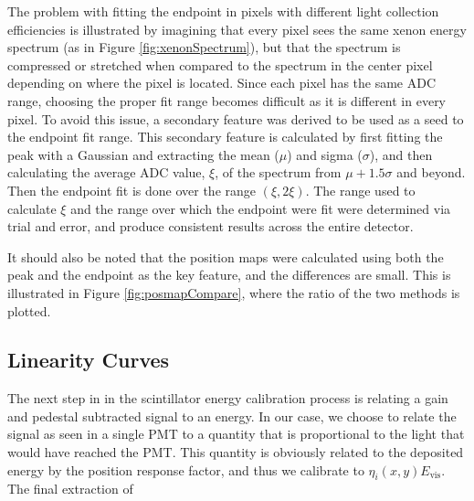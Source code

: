 The problem with fitting the endpoint in pixels with different light collection efficiencies is illustrated by
imagining that every pixel sees the same xenon energy spectrum (as in Figure \ref{fig:xenonSpectrum}), but that
the spectrum is compressed or stretched when compared to the spectrum in the center pixel depending on where
the pixel is located. Since each pixel has the same ADC range, choosing the proper fit range becomes difficult
as it is different in every pixel. To avoid this issue, a secondary feature was derived to be used as a
seed to the endpoint fit range. This secondary feature is calculated by first fitting the peak with a Gaussian
and extracting the mean ($\mu$) and sigma ($\sigma$), and then calculating the average ADC value, $\xi$, of the spectrum
from $\mu+1.5\sigma$ and beyond. Then the endpoint fit is done over the range $(\xi,2\xi)$. The range used to
calculate $\xi$ and the range over which the endpoint were fit were determined via trial and error, and produce
consistent results across the entire detector.

It should also be noted that the position maps were calculated using both the peak and the endpoint as the key
feature, and the differences are small. This is illustrated in Figure \ref{fig:posmapCompare}, where the
ratio of the two methods is plotted.


\subsection{Linearity Curves}
The next step in in the scintillator energy calibration process is relating a gain and pedestal subtracted signal
to an energy. In our case, we choose to relate the signal as seen in a single PMT to a quantity that is
proportional to the light that would have reached the PMT. This quantity is obviously related to the deposited
energy by the position response factor, and thus we calibrate to $\eta_i(x,y)E_{\mathrm{vis}}$. The final extraction
of

